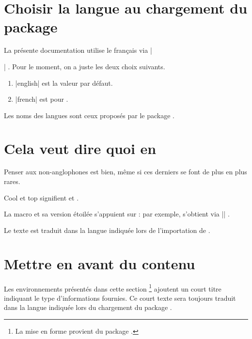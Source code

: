 \section{Choisir la langue au chargement du package}

La présente documentation utilise le français via \bdocinlatex|\usepackage[lang = french]{bdoc}| .
Pour le moment, on a juste les deux choix suivants.

\begin{enumerate}
    \item \bdocinlatex|english| est la valeur par défaut.

    \item \bdocinlatex|french| est pour .
\end{enumerate}


\begin{bdocnote}
	Les noms des langues sont ceux proposés par le package .
\end{bdocnote}


\section{Cela veut dire quoi en }

Penser aux non-anglophones est bien, même si ces derniers se font de plus en plus rares.

\begin{bdoclatex}
Cool et top signifient  et .
\end{bdoclatex}


La macro  et sa version étoilée s'appuient sur  : par exemple,  s'obtient via \bdocinlatex|| .


\begin{bdocnote}
	Le texte  est traduit dans la langue indiquée lors de l'importation de .
\end{bdocnote}


\section{Mettre en avant du contenu}

\begin{bdocnote}
    Les environnements présentés dans cette section
    \footnote{
        La mise en forme provient du package .
    }
    ajoutent un court titre indiquant le type d'informations fournies.
    Ce court texte sera toujours traduit dans la langue indiquée lors du chargement du package .
\end{bdocnote}


